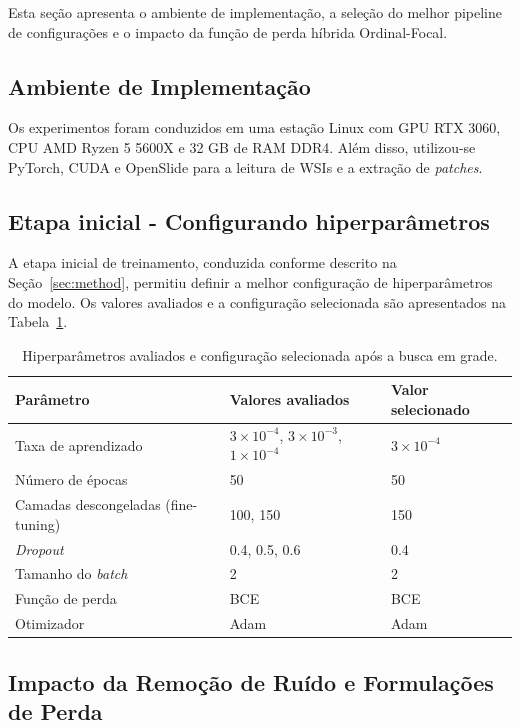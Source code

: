 Esta seção apresenta o ambiente de implementação, a seleção do melhor pipeline de configurações e o impacto da função de perda híbrida Ordinal-Focal.

\subsection{Ambiente de Implementação}
Os experimentos foram conduzidos em uma estação Linux com GPU RTX 3060, CPU AMD Ryzen 5 5600X e 32 GB de RAM DDR4. Além disso, utilizou-se PyTorch, CUDA e OpenSlide para a leitura de WSIs e a extração de \textit{patches}.

\subsection{Etapa inicial - Configurando hiperparâmetros}
\label{subsec:hiper}
A etapa inicial de treinamento, conduzida conforme descrito na Seção~\ref{sec:method}, permitiu definir a melhor configuração de hiperparâmetros do modelo. Os valores avaliados e a configuração selecionada são apresentados na Tabela~\ref{tab:hiperparametros_gridsearch}.

\begin{table}[htb]
\centering
\begin{tabular}{lll}
\toprule
\textbf{Parâmetro} & \textbf{Valores avaliados} & \textbf{Valor selecionado} \\
\midrule
Taxa de aprendizado & $3\times10^{-4}$, $3\times10^{-3}$, $1\times10^{-4}$ & $3\times10^{-4}$ \\
Número de épocas & 50 & 50 \\
Camadas descongeladas (fine-tuning) & 100, 150 & 150 \\
\textit{Dropout} & 0.4, 0.5, 0.6 & 0.4 \\
Tamanho do \textit{batch} & 2 & 2 \\
Função de perda & BCE & BCE \\
Otimizador & Adam & Adam \\
\bottomrule
\end{tabular}
\caption{Hiperparâmetros avaliados e configuração selecionada após a busca em grade.}
\label{tab:hiperparametros_gridsearch}
\end{table}

\subsection{Impacto da Remoção de Ruído e Formulações de Perda}

